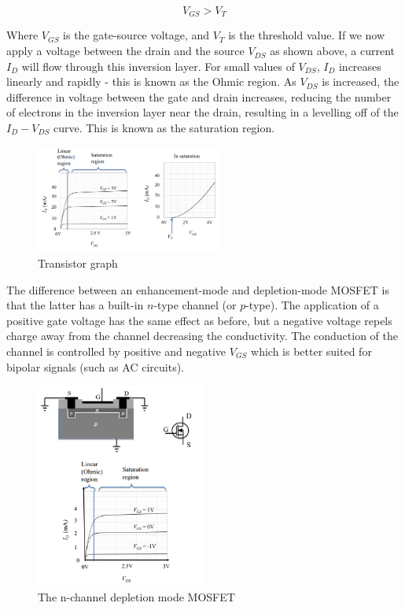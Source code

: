 \documentclass{article}
\begin{document}
\[ V_{GS} > V_T \]

Where $V_{GS}$ is the gate-source voltage, and $V_T$ is the threshold value. If we now apply a voltage between the drain and the source $V_{DS}$ as shown above, a current $I_D$ will flow through this inversion layer. For small values of $V_{DS}$, $I_D$ increases linearly and rapidly - this is known as the Ohmic region. As $V_{DS}$ is increased, the difference in voltage between the gate and drain increases, reducing the number of electrons in the inversion layer near the drain, resulting in a levelling off of the $I_D - V_{DS}$ curve. This is known as the saturation region.

\begin{figure}[h]
    \centering
    \includegraphics[width = 0.55\textwidth]{images/fet2.png}
    \caption{Transistor graph}
    \label{fig:fet2}
\end{figure}

The difference between an enhancement-mode and depletion-mode MOSFET is that the latter has a built-in $n$-type channel (or $p$-type). The application of a positive gate voltage has the same effect as before, but a negative voltage repels charge away from the channel decreasing the conductivity. The conduction of the channel is controlled by positive and negative $V_{GS}$ which is better suited for bipolar signals (such as AC circuits).

\begin{figure}[h]
    \centering
    \includegraphics[width = 0.5\textwidth]{images/fet3.png}
    \caption{The n-channel depletion mode MOSFET}
    \label{fig:enter-label}
\end{figure}
\end{document}

